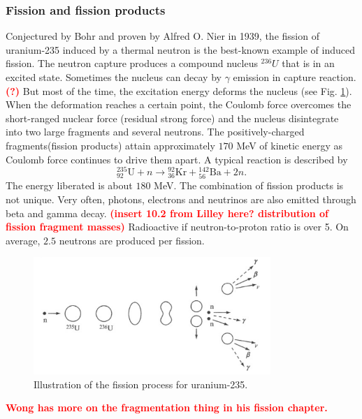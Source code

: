 \documentclass[nofootinbib,preprint,aip,pra]{revtex4-1}
\newcommand{\red}[1]{\textcolor{red}{\bf #1}}
\begin{document}
        \subsubsection{Fission and fission products}
        Conjectured by Bohr and proven by Alfred O. Nier in 1939,
        the fission of uranium-235 induced by a thermal neutron
        is the best-known example of induced fission. 
        The neutron capture produces a compound nucleus ${}^{236}U$ that is in an excited state.
        Sometimes the nucleus can decay by $\gamma$ emission in capture reaction. \red{(?)}
        But most of the time, the excitation energy deforms the nucleus (see Fig. \ref{fig:fission}).
        When the
        deformation reaches a certain point, the Coulomb force overcomes the short-ranged nuclear
        force (residual strong force) and the nucleus disintegrate into two large fragments and several neutrons. The
        positively-charged fragments(fission products) attain approximately $170$ MeV of kinetic energy as
        Coulomb force continues to drive them apart.\cite{l01}
        A typical reaction is described by
        \[{}^{235}_{92}\text{U} + n \rightarrow {}^{92}_{36}\text{Kr} + {}^{142}_{56}\text{Ba} + 2 n.\]
        The energy liberated is about $180$ MeV. The combination of fission products is not
        unique. \cite{w98, gc01}
        Very often, photons, electrons and neutrinos are also emitted through beta and gamma decay.
    \red{(insert 10.2 from Lilley here? distribution of fission fragment masses)}
        Radioactive if neutron-to-proton ratio is over 5. On average, $2.5$ neutrons are produced per fission.\cite{l01} 
        \begin{figure}[h]
            \centering
            \includegraphics[width=0.8\textwidth]{fission.png}
            \caption{Illustration of the fission process for uranium-235.\cite{l01}}
            \label{fig:fission}
        \end{figure}

        \red{Wong has more on the fragmentation thing in his fission chapter.}
\end{document}
